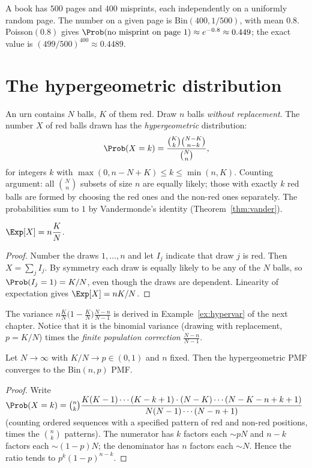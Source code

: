 \begin{example}[Misprints]
A book has $500$ pages and $400$ misprints, each independently on a uniformly
random page. The number on a given page is $\mathrm{Bin}(400,1/500)$, with mean
$0.8$. Poisson$(0.8)$ gives $\Prob(\text{no misprint on page 1})\approx
e^{-0.8}\approx0.449$; the exact value is $(499/500)^{400}\approx0.4489$.
\end{example}

\section{The hypergeometric distribution}

An urn contains $N$ balls, $K$ of them red. Draw $n$ balls \emph{without
replacement}. The number $X$ of red balls drawn has the \emph{hypergeometric}
distribution:
\[
\Prob(X=k)=\frac{\binom Kk\binom{N-K}{n-k}}{\binom Nn},
\]
for integers $k$ with $\max(0,n-N+K)\le k\le\min(n,K)$. Counting argument: all
$\binom Nn$ subsets of size $n$ are equally likely; those with exactly $k$ red
balls are formed by choosing the red ones and the non-red ones separately. The
probabilities sum to $1$ by Vandermonde's identity (Theorem~\ref{thm:vander}).

\begin{theorem}
$\Exp[X]=n\dfrac KN$.
\end{theorem}
\begin{proof}
Number the draws $1,\dots,n$ and let $I_j$ indicate that draw $j$ is red. Then
$X=\sum_jI_j$. By symmetry each draw is equally likely to be any of the $N$ balls,
so $\Prob(I_j=1)=K/N$, even though the draws are dependent. Linearity of
expectation gives $\Exp[X]=nK/N$.
\end{proof}

The variance $n\frac KN\bigl(1-\frac KN\bigr)\frac{N-n}{N-1}$ is derived in
Example~\ref{ex:hypervar} of the next chapter. Notice that it is the binomial
variance (drawing with replacement, $p=K/N$) times the \emph{finite population
correction} $\frac{N-n}{N-1}$.

\begin{proposition}
Let $N\to\infty$ with $K/N\to p\in(0,1)$ and $n$ fixed. Then the hypergeometric
PMF converges to the Bin$(n,p)$ PMF.
\end{proposition}
\begin{proof}
Write
$\Prob(X=k)=\binom nk\dfrac{K(K-1)\cdots(K-k+1)\cdot(N-K)\cdots(N-K-n+k+1)}
{N(N-1)\cdots(N-n+1)}$ (counting ordered sequences with a specified pattern of
red and non-red positions, times the $\binom nk$ patterns). The numerator has $k$
factors each $\sim pN$ and $n-k$ factors each $\sim(1-p)N$; the denominator has $n$
factors each $\sim N$. Hence the ratio tends to $p^k(1-p)^{n-k}$.
\end{proof}

